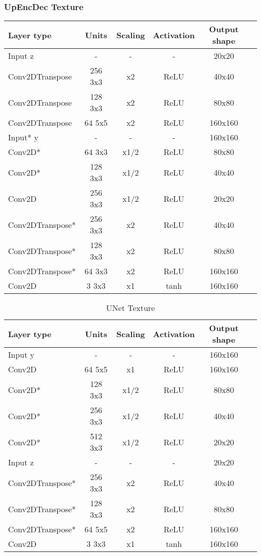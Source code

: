 \subsubsection{UpEncDec Texture}
\begin{table*}[!h]
	\centering
	\begin{tabular}{|l|c|c|c|c|c|}
		\hline
		Layer type & Units & Scaling & Activation & Output shape\\
		\hline
		Input z & - & - & - & 20x20 \\
		Conv2DTranspose & 256 3x3 & x2 & ReLU & 40x40 \\
		Conv2DTranspose & 128 3x3 & x2 & ReLU & 80x80 \\
		Conv2DTranspose & 64 5x5 & x2 & ReLU & 160x160 \\
		Input* y & - & - & - & 160x160\\
		Conv2D* & 64 3x3 & x1/2 & ReLU & 80x80 \\
		Conv2D* & 128 3x3 & x1/2 & ReLU & 40x40 \\
		Conv2D & 256 3x3 & x1/2 & ReLU & 20x20 \\
		Conv2DTranspose* & 256 3x3 & x2 & ReLU & 40x40 \\
		Conv2DTranspose* & 128 3x3 & x2 & ReLU & 80x80 \\
		Conv2DTranspose* & 64 3x3 & x2 & ReLU & 160x160 \\
		Conv2D & 3 3x3 & x1 & tanh & 160x160 \\
		\hline
	\end{tabular}
\end{table*}

\begin{table*}[!h]
	\centering
	\begin{tabular}{|l|c|c|c|c|c|}
		\hline
		Layer type & Units & Scaling & Activation & Output shape\\
		\hline
		Input y & - & - & - & 160x160\\
		Conv2D & 64 5x5 & x1 & ReLU & 160x160 \\
		Conv2D* & 128 3x3 & x1/2 & ReLU & 80x80 \\
		Conv2D* & 256 3x3 & x1/2 & ReLU & 40x40 \\
		Conv2D* & 512 3x3 & x1/2 & ReLU & 20x20 \\
		Input z & - & - & - & 20x20 \\
		Conv2DTranspose* & 256 3x3 & x2 & ReLU & 40x40 \\
		Conv2DTranspose* & 128 3x3 & x2 & ReLU & 80x80 \\
		Conv2DTranspose* & 64 5x5 & x2 & ReLU & 160x160 \\
		Conv2D & 3 3x3 & x1 & tanh & 160x160 \\
		\hline
	\end{tabular}
\caption{UNet Texture}
\end{table*}

